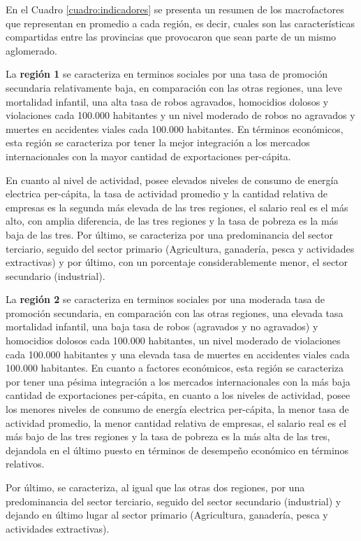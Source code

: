 \documentclass[12pt,a4paper]{article}
\begin{document}
En el Cuadro \ref{cuadro:indicadores} se presenta un resumen de los macrofactores que representan en promedio a cada región, es decir, cuales son las características compartidas entre las provincias que provocaron que sean parte de un mismo aglomerado.

La \textbf{región 1} se caracteriza en terminos sociales por una tasa de promoción secundaria relativamente baja, en comparación con las otras regiones, una leve mortalidad infantil, una alta tasa de robos agravados, homocidios dolosos y violaciones cada 100.000 habitantes y un nivel moderado de robos no agravados y muertes en accidentes viales cada 100.000 habitantes. En términos económicos, esta región se caracteriza por tener la mejor integración a los mercados internacionales con la mayor cantidad de exportaciones per-cápita. 

En cuanto al nivel de actividad, posee elevados niveles de consumo  de energía electrica per-cápita, la tasa de actividad promedio y la cantidad relativa de empresas es la segunda más elevada de las tres regiones, el salario real es el más alto, con amplia diferencia, de las tres regiones y la tasa de pobreza es la más baja de las tres. Por último, se caracteriza por una predominancia del sector terciario, seguido del sector primario (Agricultura, ganadería, pesca y actividades extractivas) y por último, con un porcentaje considerablemente menor, el sector secundario (industrial).

La \textbf{región 2} se caracteriza en terminos sociales por una moderada tasa de promoción secundaria, en comparación con las otras regiones, una elevada tasa mortalidad infantil, una baja tasa de robos (agravados y no agravados) y homocidios dolosos cada 100.000 habitantes, un nivel moderado de violaciones cada 100.000 habitantes y una elevada tasa de muertes en accidentes viales cada 100.000 habitantes. 
En cuanto a factores económicos, esta región se caracteriza por tener una pésima integración a los mercados internacionales con la más baja cantidad de exportaciones per-cápita, en cuanto a los niveles de actividad, posee los menores niveles de consumo  de energía electrica per-cápita, la menor tasa de actividad promedio, la menor cantidad relativa de empresas, el salario real es el más bajo de las tres regiones y la tasa de pobreza es la más alta de las tres, dejandola en el último puesto en términos de desempeño económico en términos relativos. 

Por último, se caracteriza, al igual que las otras dos regiones, por una predominancia del sector terciario, seguido del sector secundario (industrial) y dejando en último lugar al sector primario (Agricultura, ganadería, pesca y actividades extractivas).
\end{document}
